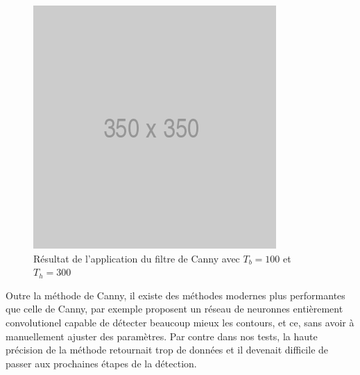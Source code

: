 
\begin{figure}[htp]
  \centering
  \includegraphics[width=0.5\linewidth]{images/placeholder.png}
  \caption{Résultat de l'application du filtre de Canny avec $T_b = 100$ et $T_h = 300$}
  \label{fig:canny}
\end{figure}

Outre la méthode de Canny, il existe des méthodes modernes plus performantes que celle de Canny, par exemple \citep{Xie2015} proposent un réseau de neuronnes entièrement convolutionel capable de détecter beaucoup mieux les contours, et ce, sans avoir à manuellement ajuster des paramètres. Par contre dans nos tests, la haute précision de la méthode retournait trop de données et il devenait difficile de passer aux prochaines étapes de la détection.

